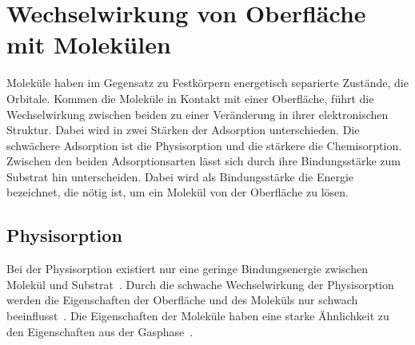     \section{Wechselwirkung von Oberfläche mit Molekülen} \label{sec:WW}
        Moleküle haben im Gegensatz zu Festkörpern energetisch separierte Zustände, die Orbitale.
        Kommen die Moleküle in Kontakt mit einer Oberfläche, führt die Wechselwirkung zwischen beiden zu einer Veränderung in ihrer elektronischen Struktur.
        Dabei wird in zwei Stärken der Adsorption unterschieden.
        Die schwächere Adsorption ist die Physisorption und die stärkere die Chemisorption. %
        Zwischen den beiden Adsorptionsarten lässt sich durch ihre Bindungsstärke zum Substrat hin unterscheiden.
        Dabei wird als Bindungsstärke die Energie bezeichnet, die nötig ist, um ein Molekül von der Oberfläche zu lösen.
        
        \subsection{Physisorption}
            Bei der Physisorption existiert nur eine geringe Bindungsenergie zwischen Molekül und Substrat~\cite{IF_16}. 
            Durch die schwache Wechselwirkung der Physisorption werden die Eigenschaften der Oberfläche und des Moleküls nur schwach beeinflusst~\cite{bergenti_spinterface_2019}.
            Die Eigenschaften der Moleküle haben eine starke Ähnlichkeit zu den Eigenschaften aus der Gasphase~\cite{IF_16}.

